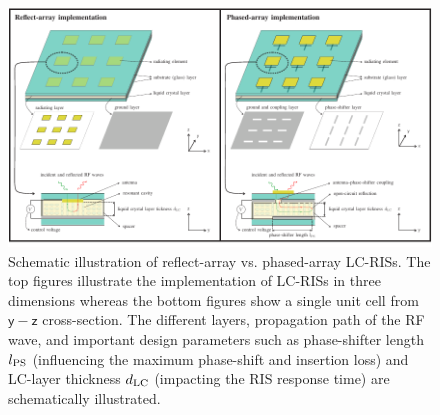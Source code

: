 
\begin{figure}[t]
	\centering
\includegraphics[width=1.9\columnwidth]{Figures/LCrisPARA.pdf}
    \caption{Schematic illustration of reflect-array vs. phased-array LC-RISs. The top figures illustrate the implementation of LC-RISs in three dimensions whereas the bottom figures show a single unit cell from $\mathsf{y}-\mathsf{z}$ cross-section. The different layers, propagation path of the RF wave, and important design parameters such as phase-shifter length $l_{\rm PS}$ (influencing the maximum phase-shift and insertion loss) and LC-layer thickness $d_{\rm LC}$ (impacting the RIS response time) are schematically illustrated.}
    \label{fig:LCrisPARA}
\end{figure}

